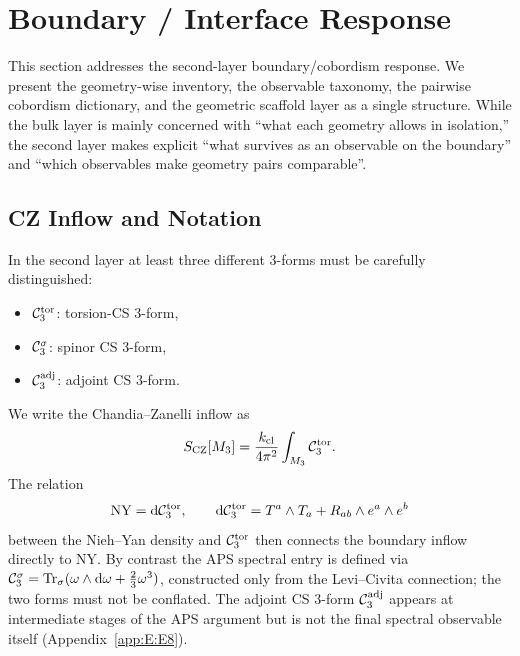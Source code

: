 \section{Boundary / Interface Response}
\label{sec:boundary}

This section addresses the second-layer boundary/cobordism response.  We
present the geometry-wise inventory, the observable taxonomy, the pairwise
cobordism dictionary, and the geometric scaffold layer as a single structure.
While the bulk layer is mainly concerned with ``what each geometry allows in
isolation,'' the second layer makes explicit ``what survives as an observable
on the boundary'' and ``which observables make geometry pairs comparable''.

\subsection{CZ Inflow and Notation}
\label{sec:boundary:cz}

In the second layer at least three different 3-forms must be carefully
distinguished:
\begin{itemize}
  \item $\mathcal{C}_3^{\mathrm{tor}}$: torsion-CS 3-form,
  \item $\mathcal{C}_3^{\sigma}$: spinor CS 3-form,
  \item $\mathcal{C}_3^{\mathrm{adj}}$: adjoint CS 3-form.
\end{itemize}
We write the Chandia--Zanelli inflow \cite{Chandia1997} as
\begin{equation}
  S_{\mathrm{CZ}}[M_3] = \frac{k_{\mathrm{cl}}}{4\pi^2}\int_{M_3} \mathcal{C}_3^{\mathrm{tor}}.
\end{equation}
The relation
\begin{equation}
  \mathrm{NY} = \mathrm{d} \mathcal{C}_3^{\mathrm{tor}},
  \qquad
  \mathrm{d} \mathcal{C}_3^{\mathrm{tor}} = T^a\wedge T_a + R_{ab}\wedge e^a\wedge e^b
\end{equation}
between the Nieh--Yan density and $\mathcal{C}_3^{\mathrm{tor}}$ then connects the boundary inflow
directly to NY.  By contrast the APS spectral entry \cite{APS1975} is
defined via $\mathcal{C}_3^{\sigma} = \mathrm{Tr}_\sigma(\omega\wedge \mathrm{d}\omega + \tfrac{2}{3}\omega^3)$,
constructed only from the Levi--Civita connection; the two forms must not
be conflated.  The adjoint CS 3-form $\mathcal{C}_3^{\mathrm{adj}}$ appears at intermediate stages
of the APS argument but is not the final spectral observable itself
(Appendix~\ref{app:E:E8}).

